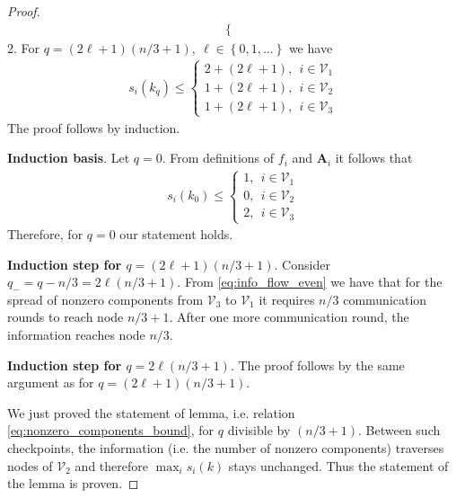 \documentclass{article}
\newcommand{\cV}{\mathcal{V}}
\newcommand{\mA}{\mathbf{A}}
\newcommand{\braces}[1]{\left\{ #1 \right\}}
\begin{document}
\begin{proof}
\begin{align}
\begin{cases}
		\end{cases}
	\end{align}
	2. For $q = (2\ell + 1)(n/3 + 1),~ \ell\in\braces{0, 1, \ldots}$ we have
	\begin{align}\label{eq:info_flow_odd}
		s_i(k_q)\leq
		\begin{cases}
			2 + (2\ell + 1),~~ i\in\cV_1 \\
			1 + (2\ell + 1),~~ i\in\cV_2 \\
			1 + (2\ell + 1),~~ i\in\cV_3
		\end{cases}
	\end{align}
	The proof follows by induction.
	
	\noindent\textbf{Induction basis}. Let $q = 0$. From definitions of $f_i$ and $\mA_i$ it follows that
	\begin{align*}
			s_i(k_0) \leq 
			\begin{cases}
			1,~~ i\in\cV_1 \\
			0,~~ i\in\cV_2 \\
			2,~~ i\in\cV_3
		\end{cases}
	\end{align*}
	Therefore, for $q = 0$ our statement holds.
	
	\noindent\textbf{Induction step for $q = (2\ell + 1)(n/3 + 1)$}. Consider $q_- = q - n/3 = 2\ell(n/3 + 1)$. From \eqref{eq:info_flow_even} we have that for the spread of nonzero components from $\cV_3$ to $\cV_1$ it requires $n/3$ communication rounds to reach node $n/3 + 1$. After one more communication round, the information reaches node $n/3$.
	
	\noindent\textbf{Induction step for $q = 2\ell (n/3 + 1)$}. The proof follows by the same argument as for $q = (2\ell + 1)(n/3 + 1)$.

	\vspace{0.5cm} We just proved the statement of lemma, i.e. relation \eqref{eq:nonzero_components_bound}, for $q$ divisible by $(n/3 + 1)$. Between such checkpoints, the information (i.e. the number of nonzero components) traverses nodes of $\cV_2$ and therefore $\max_i s_i(k)$ stays unchanged. Thus the statement of the lemma is proven. 
\end{proof}
\end{document}
